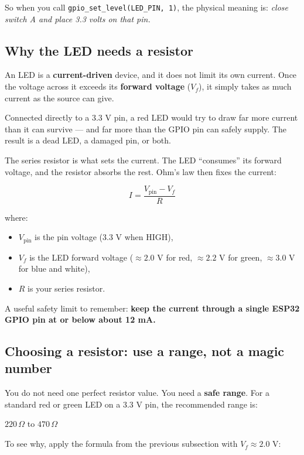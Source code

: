 \documentclass[11pt]{article}
\begin{document}
So when you call \texttt{gpio\_set\_level(LED\_PIN, 1)}, the physical meaning is: \emph{close switch A and place 3.3 volts on that pin.}

\subsection{Why the LED needs a resistor}

An LED is a \textbf{current-driven} device, and it does not limit its own current. Once the voltage across it exceeds its \textbf{forward voltage} ($V_f$), it simply takes as much current as the source can give.

Connected directly to a 3.3 V pin, a red LED would try to draw far more current than it can survive --- and far more than the GPIO pin can safely supply. The result is a dead LED, a damaged pin, or both.

The series resistor is what sets the current. The LED ``consumes'' its forward voltage, and the resistor absorbs the rest. Ohm's law then fixes the current:

\[
I = \frac{V_{\mathrm{pin}} - V_f}{R}
\]

where:

\begin{itemize}
    \item $V_{\mathrm{pin}}$ is the pin voltage (3.3 V when HIGH),
    \item $V_f$ is the LED forward voltage ($\approx 2.0$ V for red, $\approx 2.2$ V for green, $\approx 3.0$ V for blue and white),
    \item $R$ is your series resistor.
\end{itemize}

A useful safety limit to remember: \textbf{keep the current through a single ESP32 GPIO pin at or below about 12 mA.}

\subsection{Choosing a resistor: use a range, not a magic number}

You do not need one perfect resistor value. You need a \textbf{safe range}. For a standard red or green LED on a 3.3 V pin, the recommended range is:

\begin{center}
$220\,\Omega$ to $470\,\Omega$
\end{center}

To see why, apply the formula from the previous subsection with $V_f \approx 2.0$ V:
\end{document}
